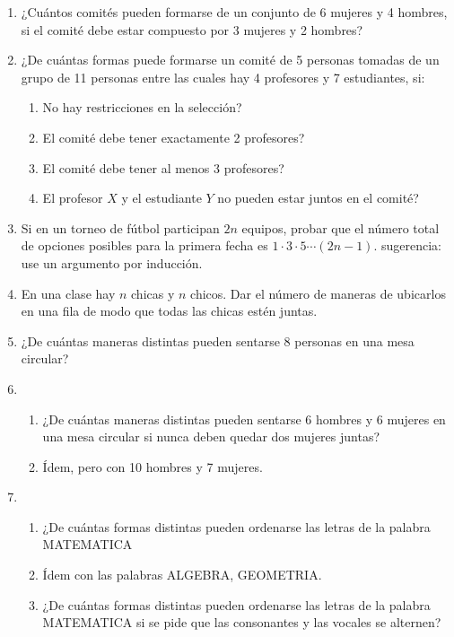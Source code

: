 \documentclass[12pt,spanish,makeidx]{amsbook}
\begin{document}
\begin {enumerate}
\item ¿Cuántos comités pueden formarse de un conjunto de 6 mujeres y 4 hombres, si el comité debe estar compuesto por 3 mujeres y 2 hombres?

\smallskip

\item ¿De cuántas formas puede formarse un comité de 5 personas tomadas de un grupo de 11 personas entre las cuales hay 4 profesores y 7 estudiantes, si:
\begin{enumerate}
	\item No hay restricciones en la selección?

	\item El comité debe tener exactamente 2 profesores?

	\item El comité debe tener al menos 3 profesores?

	\item El profesor $X$ y el estudiante $Y$ no pueden estar juntos en el comité?
\end{enumerate}

\smallskip

\item Si en un torneo de fútbol participan $2n$ equipos, probar que el número total de opciones posibles para la primera fecha es $1\cdot 3\cdot 5 \cdots (2n - 1)$. sugerencia: use un argumento por inducción. 

\smallskip

\item En una clase hay $n$ chicas y $n$ chicos. Dar el número de maneras de ubicarlos en una fila de modo que todas las chicas estén juntas.

\smallskip

\item ¿De cuántas maneras  distintas pueden sentarse 8 personas en una mesa circular?

\smallskip

\item \begin{enumerate}
	\item ¿De cuántas maneras distintas pueden sentarse 6 hombres y 6 mujeres en una mesa circular si nunca deben quedar dos mujeres juntas?
	\item \'Idem, pero con 10 hombres y 7 mujeres.
\end{enumerate}

\smallskip

\item 
\begin{enumerate}
	\item  ¿De cuántas formas distintas pueden ordenarse las letras de la palabra MATEMATICA
	\item \'Idem con las palabras ALGEBRA, GEOMETRIA.
	\item ¿De cuántas formas distintas pueden ordenarse las letras de la palabra MATEMATICA si se pide que las consonantes y las vocales se alternen?
\end{enumerate}


\end{enumerate}
\end{document}

